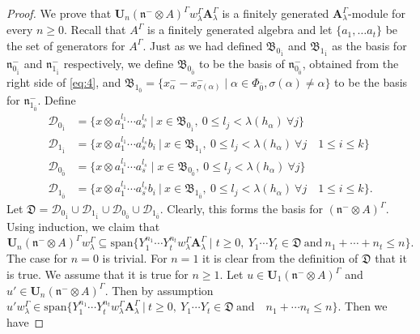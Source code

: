 \documentclass[11pt]{amsart}
\theoremstyle{plain}
\theoremstyle{definition}
\newcommand{\n}{\mathfrak{n}}
\newcommand{\A}{\mathbf{A}_{\lambda}^{\Gamma}}
\newcommand{\w}{w_{\lambda}^{\Gamma}}
\begin{document}
 \begin{proof}
We prove that $\mathbf{U}_{n}(\n^{-}\otimes A)^{\Gamma}\w\A$ is a finitely generated $\A$-module for every $n\geq 0$. Recall that $A^{\Gamma}$ is a finitely generated algebra and let $\{a_{1},\ldots a_{t}\}$ be the set of generators for $A^{\Gamma}$. Just as we had defined $\mathfrak{B}_{0_{\bar{1}}}$ and $\mathfrak{B}_{1_{\bar{1}}}$ as the basis for $\n^{-}_{0_{\bar{1}}}$ and $\n^{-}_{1_{\bar{1}}}$ respectively, we define $\mathfrak{B}_{0_{\bar{0}}}$ to be the basis of $\n_{0_{\bar{0}}}^{-}$, obtained from the right side of \eqref{eq:4}, and $\mathfrak{B}_{1_{\bar{0}}}=\{x^{-}_{\alpha}-x^{-}_{\sigma(\alpha)}\mid\alpha\in\Phi_{\bar{0}},\sigma(\alpha)\neq\alpha\}$ to be the basis for $\n^{-}_{1_{\bar{0}}}$. Define
     \begin{align*}
\mathcal{D}_{0_{\bar{1}}}&=\{x\otimes a_{1}^{l_1}\cdots a_{s}^{l_s}~|~x\in \mathfrak{B}_{0_{\bar{1}}},~0\leq l_{j}<\lambda(h_{\alpha})~\forall j\}\\
\mathcal{D}_{1_{\bar{1}}}&=\{x\otimes a_{1}^{l_1}\cdots a_{s}^{l_s}b_{i}~|~x\in \mathfrak{B}_{1_{\bar{1}}},~0\leq l_{j}<\lambda(h_{\alpha})~\forall j\quad 1\leq i\leq k\}\\
\mathcal{D}_{0_{\bar{0}}}&=\{x\otimes a_{1}^{l_1}\cdots a_{s}^{l_s} \mid x\in \mathfrak{B}_{0_{\bar{0}}},~0\leq l_{j}<\lambda(h_{\alpha})~\forall j\}\\ 
\mathcal{D}_{1_{\bar{0}}}&=\{x\otimes a_{1}^{l_1}\cdots a_{s}^{l_s}b_{i}~|~x\in \mathfrak{B}_{1_{\bar{0}}},~0\leq l_{j}<\lambda(h_{\alpha})~\forall j\quad 1\leq i\leq k\}. 
\end{align*}
Let $\mathfrak{D}=\mathcal{D}_{0_{\bar{1}}}\cup\mathcal{D}_{1_{\bar{1}}}\cup\mathcal{D}_{0_{\bar{0}}}\cup\mathcal{D}_{1_{\bar{0}}}$. Clearly, this forms the basis for $(\n^{-}\otimes A)^{\Gamma}$. Using induction, we claim that 
\begin{equation*}
         \mathbf{U}_{n}(\n^{-}\otimes A)^{\Gamma}\w\subseteq \mathrm{span}\{Y_{1}^{n_1}\cdots Y_{t}^{n_t}\w\A\mid t\geq 0,~Y_{1}\cdots Y_{t}\in\mathfrak{D} ~\mathrm{and}~
         n_{1}+\cdots +n_{t}\leq n\}.
     \end{equation*}
The case for $n=0$ is trivial. For $n=1$ it is clear from the definition of $\mathfrak{D}$ that it is true. We assume that it is true for $n\geq 1$. Let $u\in\mathbf{U}_{1}(\n^{-}\otimes A)^{\Gamma}$ and $u'\in\mathbf{U}_{n}(\n^{-}\otimes A)^{\Gamma}$. Then by assumption $u'\w\in\mathrm{span}\{Y_{1}^{n_1}\cdots Y_{t}^{n_t}\w\A~|~t\geq 0,~ Y_{1}\cdots Y_{t}\in \mathfrak{D} ~\mbox{and}\quad n_{1}+\cdots n_{t}\leq n\}$. Then we have 

\end{proof}
\end{document}
